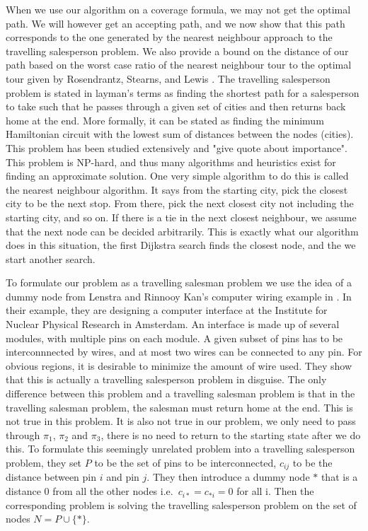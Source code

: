 When we use our algorithm on a coverage formula, we may not get the optimal path. We will however get an accepting path, and we now show that this path corresponds to the one generated by the nearest neighbour approach to the travelling salesperson problem. We also provide a bound on the distance of our path based on the worst case ratio of the nearest neighbour tour to the optimal tour given by Rosendrantz, Stearns, and Lewis \cite{rosenkrantz74}. The travelling salesperson problem is stated in layman's terms as finding the shortest path for a salesperson to take such that he passes through a given set of cities and then returns back home at the end. More formally, it can be stated as finding the minimum Hamiltonian circuit with the lowest sum of distances between the nodes (cities). This problem has been studied extensively and "give quote about importance". This problem is NP-hard, and thus many algorithms and heuristics exist for finding an approximate solution. One very simple algorithm to do this is called the nearest neighbour algorithm. It says from the starting city, pick the closest city to be the next stop. From there, pick the next closest city not including the starting city, and so on. If there is a tie in the next closest neighbour, we assume that the next node can be decided arbitrarily. This is exactly what our algorithm does in this situation, the first Dijkstra search finds the closest node, and the we start another search. 

To formulate our problem as a travelling salesman problem we use the idea of a dummy node from Lenstra and Rinnooy Kan's computer wiring example in \cite{lenstra75}. In their example, they are designing a computer interface at the Institute for Nuclear Physical Research in Amsterdam. An interface is made up of several modules, with multiple pins on each module. A given subset of pins has to be interconnnected by wires, and at most two wires can be connected to any pin. For obvious regions, it is desirable to minimize the amount of wire used. They show that this is actually a travelling salesperson problem in disguise. The only difference between this problem and a travelling salesman problem is that in the travelling salesman problem, the salesman must return home at the end. This is not true in this problem. It is also not true in our problem, we only need to pass through $\pi_1$, $\pi_2$ and $\pi_3$, there is no need to return to the starting state after we do this. To formulate this seemingly unrelated problem into a travelling salesperson problem, they set $P$ to be the set of pins to be interconnected, $c_{ij}$ to be the distance between pin $i$ and pin $j$. They then introduce a dummy node $*$ that is a distance 0 from all the other nodes i.e.\ $c_{i*} = c_{*i} = 0$ for all i. Then the corresponding problem is solving the travelling salesperson problem on the set of nodes $N=P \cup \{*\}$. 

